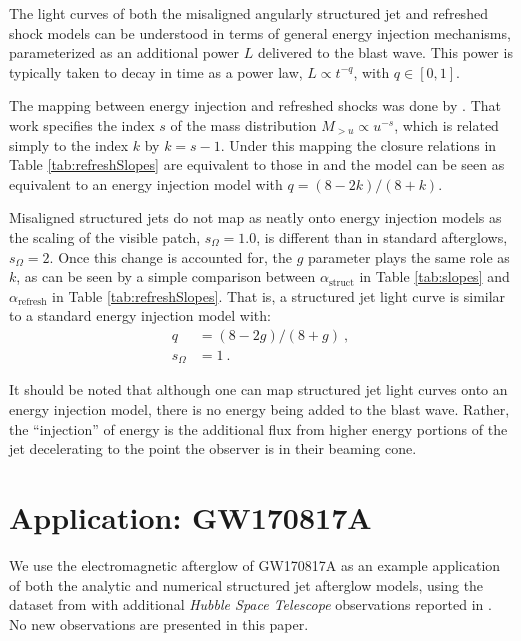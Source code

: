 \documentclass[twocolumn]{aastex62}
\newcommand{\gwbns}{GW170817A}
\newcommand{\hubble}{{\em Hubble Space Telescope}}
\newcommand{\som}{\ensuremath{s_{\Omega}}}
\begin{document}
The light curves of both the misaligned angularly structured jet and refreshed shock models can be understood in terms of general energy injection mechanisms, parameterized as an additional power $L$ delivered to the blast wave.  This power is typically taken to decay in time as a power law, $L \propto t^{-q}$, with $q \in [0,1]$.

The mapping between energy injection and refreshed shocks was done by \cite{Zhang:2006aa}.  That work specifies the index $s$ of the mass distribution $M_{>u} \propto u^{-s}$, which is related simply to the index $k$ by $k = s-1$. Under this mapping the closure relations in Table \ref{tab:refreshSlopes} are equivalent to those in \cite{Zhang:2006aa} and the model can be seen as equivalent to an energy injection model with $q = (8-2k) / (8+k)$.

Misaligned structured jets do not map as neatly onto energy injection models as the scaling of the visible patch, $\som = 1.0$, is different than in standard afterglows, $\som = 2$. Once this change is accounted for, the $g$ parameter plays the same role as $k$, as can be seen by a simple comparison between $\alpha_{\text{struct}}$ in Table \ref{tab:slopes} and $\alpha_{\text{refresh}}$ in Table \ref{tab:refreshSlopes}.  That is, a structured jet light curve is similar to a standard energy injection model with:
\begin{align}
	q &= (8-2g) / (8+g)\ ,  \label{eq:struct2ei} \\
	\som &= 1\ .
\end{align}

It should be noted that although one can map structured jet light curves onto an energy injection model, there is no energy being added to the blast wave. Rather, the ``injection'' of energy is the additional flux from higher energy portions of the jet decelerating to the point the observer is in their beaming cone.

%
%

\section{Application: \gwbns{}}\label{sec:gw170817}

We use the electromagnetic afterglow of \gwbns{} as an example application of both the analytic and numerical structured jet afterglow models, using the dataset from \citet{Troja:2019ab} with additional \hubble{} observations reported in \citet{Lamb:2019aa}. No new observations are presented in this paper.
\end{document}
